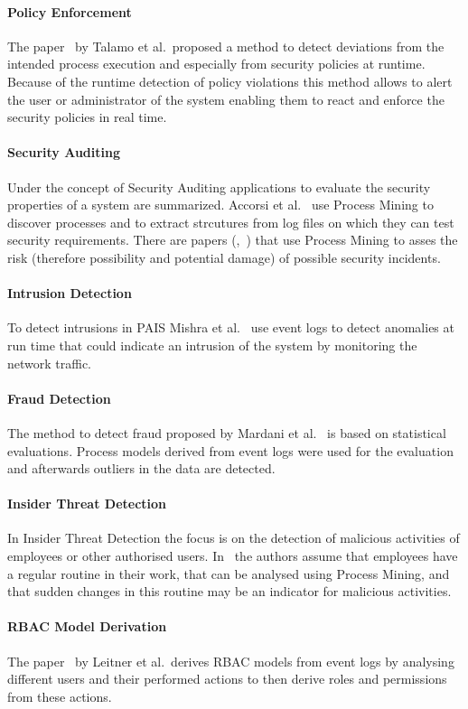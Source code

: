 \documentclass[runningheads]{llncs}
\begin{document}
\paragraph{Policy Enforcement} The paper~\cite{Talamo2013} by Talamo et al.\ proposed a method to detect deviations from the intended process execution and especially from security policies at runtime. Because of the runtime detection of policy violations this
method allows to alert the user or administrator of the system enabling them to react and enforce the security policies in real time.
\paragraph{Security Auditing} Under the concept of Security Auditing applications to evaluate the security properties of a system are summarized. Accorsi et al.~\cite{Accorsi20131462} use Process Mining to discover processes and to extract strcutures from log files
on which they can test security requirements. There are papers (\cite{Yunizal20221387},~\cite{Dedousis202235}) that use Process Mining to asses the risk (therefore possibility and potential damage) of possible security incidents.
\paragraph{Intrusion Detection} To detect intrusions in PAIS Mishra et al.~\cite{Mishra2018613} use event logs to detect anomalies at run time that could indicate an intrusion of the system by monitoring the network traffic.
\paragraph{Fraud Detection} The method to detect fraud proposed by Mardani et al.~\cite{Mardani2013} is based on statistical evaluations. Process models derived from event logs were used for the evaluation and afterwards outliers in the data are detected.
\paragraph{Insider Threat Detection} In Insider Threat Detection the focus is on the detection of malicious activities of employees or other authorised users. In~\cite{MacAk2020} the authors assume that employees have a regular routine in their work, that can be
analysed using Process Mining, and that sudden changes in this routine may be an indicator for malicious activities.
\paragraph{RBAC Model Derivation} The paper~\cite{Leitner2013719} by Leitner et al.\ derives RBAC models from event logs by analysing different users and their performed actions to then derive roles and permissions from these actions.
\end{document}
